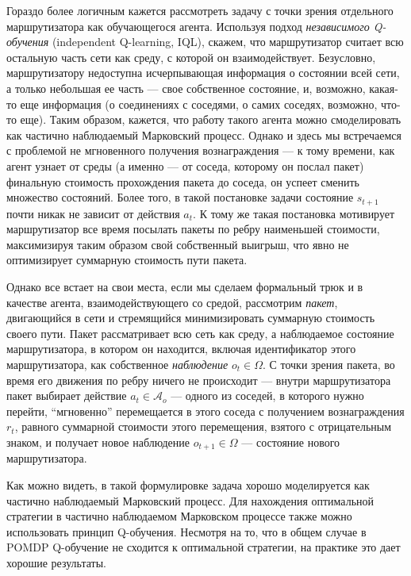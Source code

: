 \documentclass[specification, annotation]{itmo-student-thesis}
\begin{document}
Гораздо более логичным кажется рассмотреть задачу с точки зрения отдельного
маршрутизатора как обучающегося агента. Используя подход \textit{независимого
  Q-обучения} (independent Q-learning, IQL)\cite{tan1993multi}, скажем, что
маршрутизатор считает всю остальную часть сети как среду, с которой он
взаимодействует. Безусловно, маршрутизатору недоступна исчерпывающая информация
о состоянии всей сети, а только небольшая ее часть --- свое собственное
состояние, и, возможно, какая-то еще информация (о соединениях с соседями, о
самих соседях, возможно, что-то еще). Таким образом, кажется, что работу такого
агента можно смоделировать как частично наблюдаемый Марковский процесс. Однако и
здесь мы встречаемся с проблемой не мгновенного получения вознаграждения --- к
тому времени, как агент узнает от среды (а именно --- от соседа, которому он
послал пакет) финальную стоимость прохождения пакета до соседа, он успеет
сменить множество состояний. Более того, в такой постановке задачи состояние
$s_{t+1}$ почти никак не зависит от действия $a_t$. К тому же такая постановка
мотивирует маршрутизатор все время посылать пакеты по ребру наименьшей
стоимости, максимизируя таким образом свой собственный выигрыш, что явно не
оптимизирует суммарную стоимость пути пакета.

Однако все встает на свои места, если мы сделаем формальный трюк и в качестве
агента, взаимодействующего со средой, рассмотрим \textit{пакет}, двигающийся в
сети и стремящийся минимизировать суммарную стоимость своего пути. Пакет
рассматривает всю сеть как среду, а наблюдаемое состояние маршрутизатора, в
котором он находится, включая идентификатор этого маршрутизатора, как
собственное \textit{наблюдение}  $o_t \in \Omega$. С точки зрения пакета, во время
его движения по ребру ничего не происходит --- внутри маршрутизатора пакет
выбирает действие $a_t \in \mathcal{A}_o$ --- одного из соседей, в которого нужно
перейти, ``мгновенно'' перемещается в этого соседа с получением вознаграждения $r_t$,
равного суммарной стоимости этого перемещения, взятого с отрицательным знаком, и
получает новое наблюдение $o_{t+1} \in \Omega$ --- состояние нового маршрутизатора.

Как можно видеть, в такой формулировке задача хорошо моделируется как частично
наблюдаемый Марковский процесс. Для нахождения оптимальной стратегии в частично
наблюдаемом Марковском процессе также можно использовать принцип Q-обучения.
Несмотря на то, что в общем случае в POMDP Q-обучение не сходится к оптимальной
стратегии, на практике это дает хорошие результаты.
\end{document}
